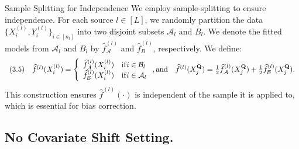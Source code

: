 \documentclass{beamer}
\begin{document}
\begin{frame}{Sample Splitting for Independence}
    We employ sample-splitting to ensure independence. For each source $l \in [ L ]$, we randomly partition the data $\{ X _ { i } ^ { ( l ) } , Y _ { i } ^ { ( l ) } \} _ { i \in [ n _ { l } ] }$ into two disjoint subsets $\mathcal { A } _ { l }$ and $B _ { l }$. We denote the fitted models from $\mathcal { A } _ { l }$ and $B _ { l }$ by $\widehat { f } _ { \mathcal { A } } ^ { ( l ) }$ and $\widehat { f } _ { B } ^ { ( l ) }$, respectively. We define:
    $$
    \begin{array}{r l} {(3. 5)} & {\widehat {f} ^ {(l)} (X _ {i} ^ {(l)}) = \left\{ \begin{array}{l l} \widehat {f} _ {\mathcal {A}} ^ {(l)} (X _ {i} ^ {(l)}) & \mathrm{if} i \in \mathcal {B} _ {l} \\ \widehat {f} _ {\mathcal {B}} ^ {(l)} (X _ {i} ^ {(l)}) & \mathrm{if} i \in \mathcal {A} _ {l} \end{array} \right., \mathrm{and} \quad \widehat {f} ^ {(l)} (X _ {j} ^ {\mathbf {Q}}) = \frac {1}{2} \widehat {f} _ {\mathcal {A}} ^ {(l)} (X _ {j} ^ {\mathbf {Q}}) + \frac {1}{2} \widehat {f} _ {\mathcal {B}} ^ {(l)} (X _ {j} ^ {\mathbf {Q}}).} \end{array}
    $$
    This construction ensures $\widehat { f } ^ { ( l ) } ( \cdot )$ is independent of the sample it is applied to, which is essential for bias correction.
\end{frame}

\subsection{No Covariate Shift Setting.}
\end{document}
